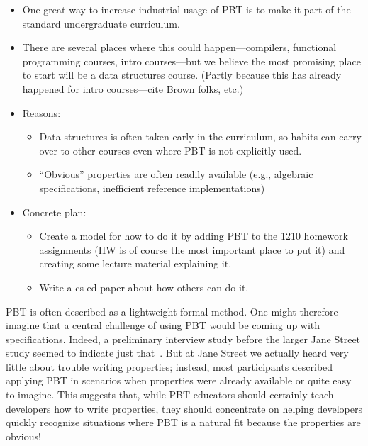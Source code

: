%

\begin{itemize}
\item One great way to increase industrial usage of PBT is to make it
part of the standard undergraduate curriculum.
\item There are several places where this could happen---compilers,
functional programming courses, intro courses---but we believe the
most promising place to start will be a data structures course.
(Partly because this has already happened for intro courses---cite
Brown folks, etc.)
\item Reasons:
  \begin{itemize}
  \item Data structures is often taken early in the curriculum, so
  habits can carry over to other courses even where PBT is not
  explicitly used.
  \item ``Obvious'' properties are often readily available (e.g.,
  algebraic specifications, inefficient reference implementations)
  \end{itemize}
\item Concrete plan:
\begin{itemize}
\item Create a model for how to do it by adding PBT to
the 1210 homework assignments (HW is of course the most important
place to put it) and creating some lecture material explaining it.
\item Write a cs-ed paper about how others can do it.
\end{itemize}
\end{itemize}

\ifdraft
{}
\fi

%
PBT is often described as a lightweight formal method.  One
might therefore imagine that a central challenge of using PBT would be
coming up with specifications. Indeed, a preliminary interview
study before the larger Jane Street study seemed to indicate just
that~\cite{ref:goldstein2022some}. But at
Jane Street we actually heard very little about trouble
writing
properties; instead, most participants described applying PBT in scenarios when
properties were already available or quite easy to imagine. This suggests that,
while PBT educators should certainly teach developers how to
write properties, they should concentrate on
helping developers quickly recognize situations where PBT is a
natural fit because the properties are obvious!

